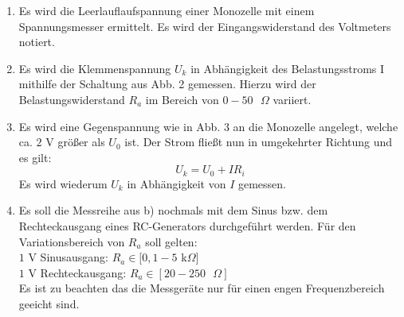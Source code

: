 \begin{enumerate}
    \item Es wird die Leerlauflaufspannung einer Monozelle mit einem Spannungsmesser ermittelt.
    Es wird der Eingangswiderstand des Voltmeters notiert.

    \item Es wird die Klemmenspannung $U_k$ in Abhängigkeit des Belastungsstroms I mithilfe
    der Schaltung aus Abb. 2 gemessen.
    Hierzu wird der Belastungswiderstand $R_a$ im Bereich von $ 0-50\text{ }\Omega$ variiert.

    \item Es wird eine Gegenspannung wie in Abb. 3 an die Monozelle angelegt, welche ca. $2$ V
    größer als $U_0$ ist. Der Strom fließt nun in umgekehrter Richtung und es gilt:
    \begin{equation}
	    U_k = U_0 + IR_i
    \end{equation}
    Es wird wiederum $U_k$ in Abhängigkeit von $I$ gemessen.

    \item Es soll die Messreihe aus b) nochmals mit dem Sinus bzw. dem
    Rechteckausgang eines RC-Generators durchgeführt werden. Für den Variationsbereich
    von $R_a$ soll gelten:\\
    $1$ V Sinusausgang: $R_a \in [0,1 - 5 $ k$\Omega]$\\
    $1$ V Rechteckausgang: $R_a \in [20 -250\text{ }\Omega]$\\
    Es ist zu beachten das die Messgeräte nur für einen engen Frequenzbereich geeicht sind.
\end{enumerate}
